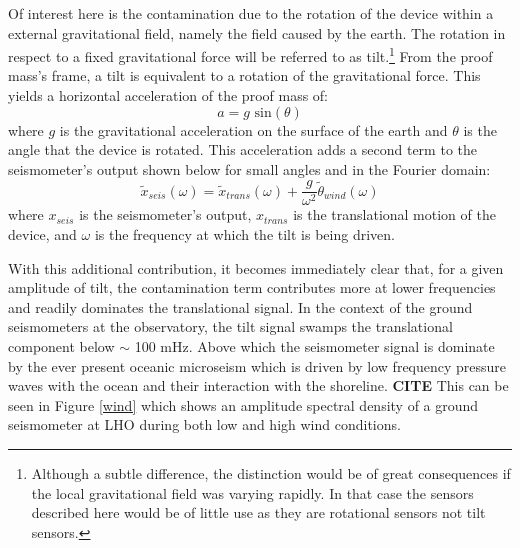 \documentclass [12pt, proquest]{uwthesis}[2019]
\begin{document}
Of interest here is the contamination due to the rotation of the device within a external gravitational field, namely the field caused by the earth. The rotation in respect to a fixed gravitational force will be referred to as tilt.\footnote{Although a subtle difference, the distinction would be of great consequences if the local gravitational field was varying rapidly. In that case the sensors described here would be of little use as they are rotational sensors not tilt sensors.} From the proof mass's frame, a tilt is equivalent to a rotation of the gravitational force. This yields a horizontal acceleration of the proof mass of:
\[ a=g \text{ sin}(\theta)\]
where $g$ is the gravitational acceleration on the surface of the earth and $\theta$ is the angle that the device is rotated. This acceleration adds a second term to the seismometer's output shown below for small angles and in the Fourier domain:
\[\tilde{x}_{seis}(\omega)=\tilde{x}_{trans}(\omega)+\frac{g}{\omega^2}\tilde{\theta}_{wind}(\omega)\]
where $x_{seis}$ is the seismometer's output, $x_{trans}$ is the translational motion of the device, and $\omega$ is the frequency at which the tilt is being driven. 

With this additional contribution, it becomes immediately clear that, for a given amplitude of tilt, the contamination term contributes more at lower frequencies and readily dominates the translational signal. In the context of the ground seismometers at the observatory, the tilt signal swamps the translational component below $\sim$ 100 mHz. Above which the seismometer signal is dominate by the ever present oceanic microseism which is driven by low frequency pressure waves with the ocean and their interaction with the shoreline. \textbf{CITE} This can be seen in Figure \ref{wind} which shows an amplitude spectral density of a ground seismometer at LHO during both low and high wind conditions.
\end{document}
